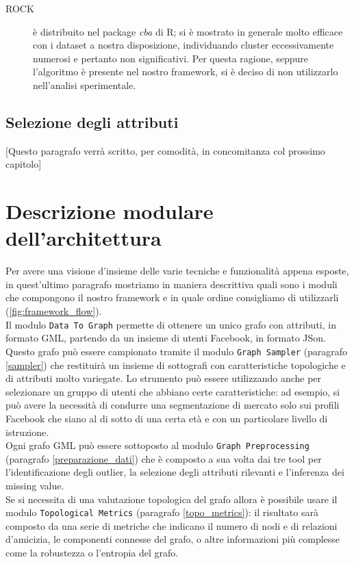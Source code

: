 \begin{description}
\item [ROCK] \`e distribuito nel package \textit{cba} di R; si \`e mostrato in generale molto efficace con i dataset a nostra disposizione, individuando cluster eccessivamente numerosi e pertanto non significativi. Per questa ragione, seppure l'algoritmo \`e presente nel nostro framework, si \`e deciso di non utilizzarlo nell'analisi sperimentale.
\end{description}

\subsection{Selezione degli attributi}
[Questo paragrafo verr\`a scritto, per comodit\`a, in concomitanza col prossimo capitolo]

\section{Descrizione modulare dell'architettura}
Per avere una visione d'insieme delle varie tecniche e funzionalit\`a appena esposte, in quest'ultimo paragrafo mostriamo in maniera descrittiva quali sono i moduli che compongono il nostro framework e in quale ordine consigliamo di utilizzarli (\autoref{fig:framework_flow}).\\
Il modulo \texttt{Data To Graph} permette di ottenere un unico grafo con attributi, in formato GML, partendo da un insieme di utenti Facebook, in formato JSon.\\
Questo grafo pu\`o essere campionato tramite il modulo \texttt{Graph Sampler} (paragrafo \ref{sampler}) che restituir\`a un insieme di sottografi con caratteristiche topologiche e di attributi molto variegate. Lo strumento pu\`o essere utilizzando anche per selezionare un gruppo di utenti che abbiano certe caratteristiche: ad esempio, si pu\`o avere la necessit\`a di condurre una segmentazione di mercato solo sui profili Facebook che siano al di sotto di una certa et\`a e con un particolare livello di istruzione.\\
Ogni grafo GML pu\`o essere sottoposto al modulo \texttt{Graph Preprocessing} (paragrafo \ref{preparazione_dati}) che \`e composto a sua volta dai tre tool per l'identificazione degli outlier, la selezione degli attributi rilevanti e l'inferenza dei missing value.\\
Se si necessita di una valutazione topologica del grafo allora \`e possibile usare il modulo \texttt{Topological Metrics} (paragrafo \ref{topo_metrics}): il risultato sar\`a composto da una serie di metriche che indicano il numero di nodi e di relazioni d'amicizia, le componenti connesse del grafo, o altre informazioni pi\`u complesse come la robustezza o l'entropia del grafo.\\
